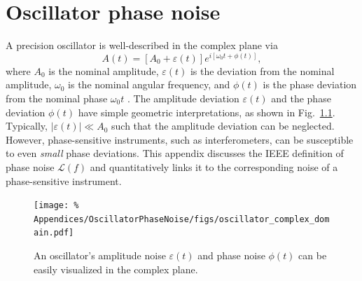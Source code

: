 \chapter{Oscillator phase noise}
\label{app:OscillatorPhaseNoise}
A precision oscillator is well-described in the complex plane via
\begin{equation}
  A(t)
  =
  \left[ A_0 + \varepsilon(t) \right]
  e^{i \left[ \omega_0 t + \phi(t) \right]},
\end{equation}
where
$A_0$ is the nominal amplitude,
$\varepsilon(t)$ is the deviation from the nominal amplitude,
$\omega_0$ is the nominal angular frequency, and
$\phi(t)$ is the phase deviation from the nominal phase $\omega_0 t$
\cite{ieee_std1139}.
The amplitude deviation $\varepsilon(t)$ and
the phase deviation $\phi(t)$ have simple geometric interpretations,
as shown in Fig.~\ref{fig:OscillatorPhaseNoise:oscillator_complex_plane}.
Typically, $|\varepsilon(t)| \ll A_0$ such that
the amplitude deviation can be neglected.
However, phase-sensitive instruments,
such as interferometers,
can be susceptible to even \emph{small} phase deviations.
This appendix discusses
the IEEE definition of phase noise $\mathcal{L}(f)$ and
quantitatively links it
to the corresponding noise of a phase-sensitive instrument.

\begin{figure}[h]
  \centering
  \texttt{[image: \%
    Appendices/OscillatorPhaseNoise/figs/oscillator\_complex\_domain.pdf]}
  \caption[Oscillator amplitude and phase noise in the complex plane]{%
    An oscillator's amplitude noise $\varepsilon(t)$ and
    phase noise $\phi(t)$ can be easily visualized in the complex plane.}
\label{fig:OscillatorPhaseNoise:oscillator_complex_plane}
\end{figure}


